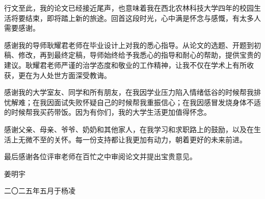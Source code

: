 \begin{acknowledgement}

行文至此，我的论文已经接近尾声，也意味着我在西北农林科技大学四年的校园生活将要结束，即将踏上新的旅途。回首这段时光，心中满是怀念与感慨，有太多人需要感谢。

感谢我的导师耿耀君老师在毕业设计上对我的悉心指导。从论文的选题、开题到初稿、修改，再到最终定稿，导师始终给予我悉心的指导和耐心的帮助，提供宝贵的建议。耿耀君老师严谨的治学态度和敬业的工作精神，让我不仅在学术上有所收获，更在为人处世方面深受教诲。

感谢我的大学室友、同学和所有朋友，在我因学业压力陷入情绪低谷的时候帮我排忧解难；在我因面试失败怀疑自己的时候帮我重振信心；在我因感冒发烧身体不适的时候帮我买药带饭。因为有你们，我的大学生活更加值得怀念。

感谢父亲、母亲、爷爷、奶奶和其他家人，在我学习和求职路上的鼓励，以及在生活上无微不至的关怀。每一份支持都让我更加有动力，朝着更好的未来前进。

最后感谢各位评审老师在百忙之中审阅论文并提出宝贵意见。

\vfill
\begin{flushright}
         姜明宇

二〇二五年五月于\quad 杨凌
\end{flushright}
\vfill





\end{acknowledgement}
